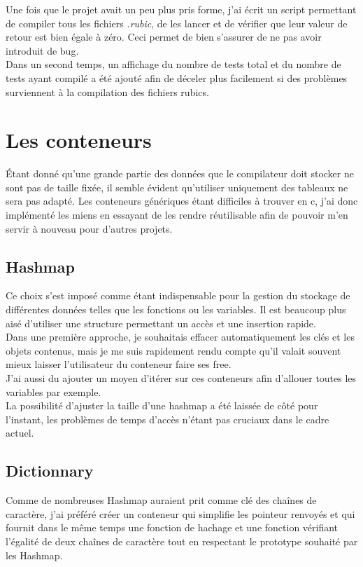 \documentclass[12pt]{article}
\begin{document}
Une fois que le projet avait un peu plus pris forme, j'ai écrit un script
permettant de compiler tous les fichiers {\em.rubic}, de les lancer et de
vérifier que leur valeur de retour est bien égale à zéro. Ceci permet de bien
s'assurer de ne pas avoir introduit de bug.\\

Dans un second temps, un affichage du nombre de tests total et du nombre de
tests ayant compilé a été ajouté afin de déceler plus facilement si des
problèmes surviennent à la compilation des fichiers rubics.

\section{Les conteneurs}

Étant donné qu'une grande partie des données que le compilateur doit stocker
ne sont pas de taille fixée, il semble évident qu'utiliser uniquement des
tableaux ne sera pas adapté. Les conteneurs génériques étant difficiles à
trouver en c, j'ai donc implémenté les miens en essayant de les rendre
réutilisable afin de pouvoir m'en servir à nouveau pour d'autres projets.

\subsection{Hashmap}
Ce choix s'est imposé comme étant indispensable pour la gestion du stockage
de différentes données telles que les fonctions ou les variables. Il est
beaucoup plus aisé d'utiliser une structure permettant un accès et une
insertion rapide.\\

Dans une première approche, je souhaitais effacer automatiquement les clés et
les objets contenus, mais je me suis rapidement rendu compte qu'il valait
souvent mieux laisser l'utilisateur du conteneur faire ses free.\\

J'ai aussi du ajouter un moyen d'itérer sur ces conteneurs afin d'allouer
toutes les variables par exemple.\\

La possibilité d'ajuster la taille d'une hashmap a été laissée de côté
pour l'instant, les problèmes de temps d'accès n'étant pas cruciaux dans le
cadre actuel.

\subsection{Dictionnary}
Comme de nombreuses Hashmap auraient prit comme clé des chaînes de caractère,
j'ai préféré créer un conteneur qui simplifie les pointeur renvoyés et
qui fournit dans le même temps une fonction de hachage et une fonction
vérifiant l'égalité de deux chaînes de caractère tout en respectant le
prototype souhaité par les Hashmap.
\end{document}

